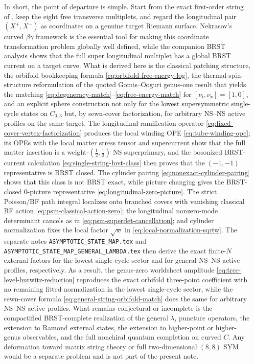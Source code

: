 \documentclass[11pt]{article}
\begin{document}
In short, the point of departure is simple. Start from the exact first-order string of \cite{gomis2000nonrelativisticclosedstringtheory}, keep the eight free transverse multiplets, and regard the longitudinal pair $(X^+,X^-)$ as coordinates on a genuine target Riemann surface. Nekrasov's curved $\beta\gamma$ framework \cite{nekrasov2005curvedbetagammasystems} is the essential tool for making this coordinate transformation problem globally well defined, while the companion BRST analysis shows that the full super longitudinal multiplet has a global BRST current on a target curve. What is derived here is the classical patching structure, the orbifold bookkeeping formula \eqref{eq:orbifold-free-energy-log}, the thermal-spin-structure reformulation of the quoted Gomis--Ooguri genus-one result that yields the matching \eqref{eq:degeneracy-match}--\eqref{eq:free-energy-match} for $[\nu_t,\nu_x]=[1,0]$, and an explicit sphere construction not only for the lowest supersymmetric single-cycle states on $C_{0,3}$ but, by sewn-cover factorization, for arbitrary NS--NS active profiles on the same target. The longitudinal ramification operator \eqref{eq:fixed-cover-vertex-factorization} produces the local winding OPE \eqref{eq:tube-winding-ope}; its OPEs with the local matter stress tensor and supercurrent show that the full matter insertion is a weight-$(\tfrac12,\tfrac12)$ NS superprimary, and the bosonized BRST-current calculation \eqref{eq:single-string-brst-class} then proves that the $(-1,-1)$ representative is BRST closed. The cylinder pairing \eqref{eq:nonexact-cylinder-pairing} shows that this class is not BRST exact, while picture changing gives the BRST-closed $0$-picture representative \eqref{eq:longitudinal-zero-picture}. The strict Poisson/BF path integral localizes onto branched covers with vanishing classical BF action \eqref{eq:psm-classical-action-zero}; the longitudinal nonzero-mode determinant cancels as in \eqref{eq:psm-superdet-cancellation}; and cylinder normalization fixes the local factor $\sqrt{w}$ in \eqref{eq:local-normalization-sqrtw}. The separate notes \texttt{ASYMPTOTIC\_STATE\_MAP.tex} and \texttt{ASYMPTOTIC\_STATE\_MAP\_GENERAL\_LAMBDA.tex} then derive the exact finite-$N$ external factors for the lowest single-cycle sector and for general NS--NS active profiles, respectively. As a result, the genus-zero worldsheet amplitude \eqref{eq:tree-level-hurwitz-reduction} reproduces the exact orbifold three-point coefficient with no remaining fitted normalization in the lowest single-cycle sector, while the sewn-cover formula \eqref{eq:general-string-orbifold-match} does the same for arbitrary NS--NS active profiles. What remains conjectural or incomplete is the compactified BRST-complete realization of the general $\lambda_i$ puncture operators, the extension to Ramond external states, the extension to higher-point or higher-genus observables, and the full nonchiral quantum completion on curved $C$. Any deformation toward matrix string theory or full two-dimensional $(8,8)$ SYM would be a separate problem and is not part of the present note.

\printbibliography
\end{document}
